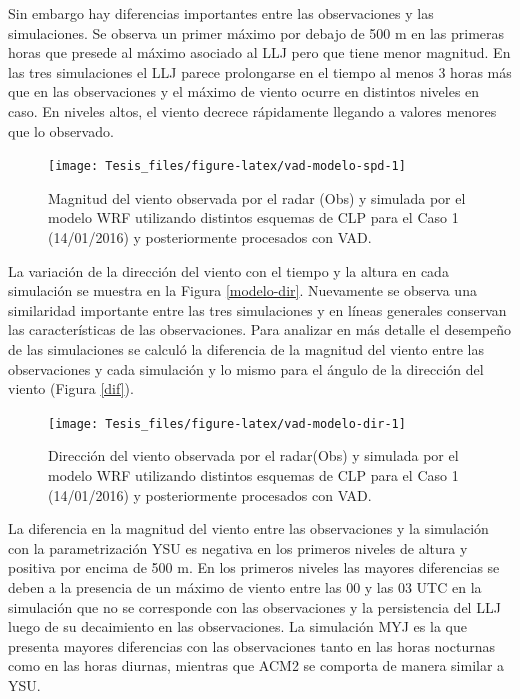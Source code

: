 \documentclass[12pt,spanish,oneside, a4paper]{book}
\begin{document}
Sin embargo hay diferencias importantes entre las observaciones y las
simulaciones. Se observa un primer máximo por debajo de 500 m en las
primeras horas que presede al máximo asociado al LLJ pero que tiene
menor magnitud. En las tres simulaciones el LLJ parece prolongarse en el
tiempo al menos 3 horas más que en las observaciones y el máximo de
viento ocurre en distintos niveles en caso. En niveles altos, el viento
decrece rápidamente llegando a valores menores que lo observado.

\begin{figure}

{\centering \texttt{[image: Tesis\_files/figure-latex/vad-modelo-spd-1]} 

}

\caption{Magnitud del viento observada por el radar (Obs) y simulada por el modelo WRF utilizando distintos esquemas de CLP para el Caso 1 (14/01/2016) y posteriormente procesados con VAD. \label{modelo-spd}}\label{fig:vad-modelo-spd}
\end{figure}

La variación de la dirección del viento con el tiempo y la altura en
cada simulación se muestra en la Figura \ref{modelo-dir}. Nuevamente se
observa una similaridad importante entre las tres simulaciones y en
líneas generales conservan las características de las observaciones.
Para analizar en más detalle el desempeño de las simulaciones se calculó
la diferencia de la magnitud del viento entre las observaciones y cada
simulación y lo mismo para el ángulo de la dirección del viento (Figura
\ref{dif}).

\begin{figure}

{\centering \texttt{[image: Tesis\_files/figure-latex/vad-modelo-dir-1]} 

}

\caption{Dirección del viento observada por el radar(Obs) y simulada por el modelo WRF utilizando distintos esquemas de CLP para el Caso 1 (14/01/2016) y posteriormente procesados con VAD. \label{modelo-dir}}\label{fig:vad-modelo-dir}
\end{figure}

La diferencia en la magnitud del viento entre las observaciones y la
simulación con la parametrización YSU es negativa en los primeros
niveles de altura y positiva por encima de 500 m. En los primeros
niveles las mayores diferencias se deben a la presencia de un máximo de
viento entre las 00 y las 03 UTC en la simulación que no se corresponde
con las observaciones y la persistencia del LLJ luego de su decaimiento
en las observaciones. La simulación MYJ es la que presenta mayores
diferencias con las observaciones tanto en las horas nocturnas como en
las horas diurnas, mientras que ACM2 se comporta de manera similar a
YSU.
\end{document}
